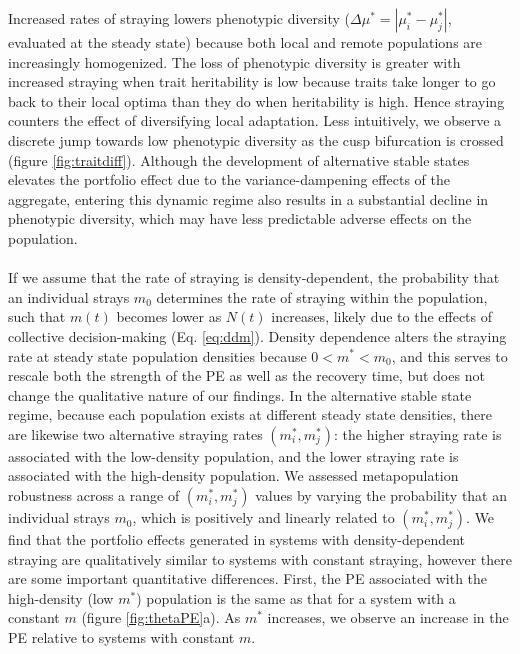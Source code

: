 \documentclass{revtex4}
\begin{document}
Increased rates of straying lowers phenotypic diversity ($\Delta \mu^* = |\mu_i^*-\mu_j^*|$, evaluated at the steady state) because both local and remote populations are increasingly homogenized.
The loss of phenotypic diversity is greater with increased straying when trait heritability is low because traits take longer to go back to their local optima than they do when heritability is high. 
Hence straying counters the effect of diversifying local adaptation. 
Less intuitively, we observe a discrete jump towards low phenotypic diversity as the cusp bifurcation is crossed (figure \ref{fig:traitdiff}).
Although the development of alternative stable states elevates the portfolio effect due to the variance-dampening effects of the aggregate, entering this dynamic regime also results in a substantial decline in phenotypic diversity, which may have less predictable adverse effects on the population.\\


 \\
If we assume that the rate of straying is density-dependent, the probability that an individual strays $m_0$ determines the rate of straying within the population, such that $m(t)$ becomes lower as $N(t)$ increases, likely due to the effects of collective decision-making \citep{Berdahl:2016dx} (Eq. \ref{eq:ddm}).
Density dependence alters the straying rate at steady state population densities because $0 < m^* < m_0$, and this serves to rescale both the strength of the PE as well as the recovery time, but does not change the qualitative nature of our findings.
In the alternative stable state regime, because each population exists at different steady state densities, there are likewise two alternative straying rates $(m_i^*,m_j^*)$: the higher straying rate is associated with the low-density population, and the lower straying rate is associated with the high-density population.
We assessed metapopulation robustness across a range of $(m_i^*,m_j^*)$ values by varying the probability that an individual strays $m_0$, which is positively and linearly related to $(m_i^*,m_j^*)$.
We find that the portfolio effects generated in systems with density-dependent straying are qualitatively similar to systems with constant straying, however there are some important quantitative differences.
First, the PE associated with the high-density (low $m^*$) population is the same as that for a system with a constant $m$ (figure \ref{fig:thetaPE}a).
As $m^*$ increases, we observe an increase in the PE relative to systems with constant $m$.
\end{document}
